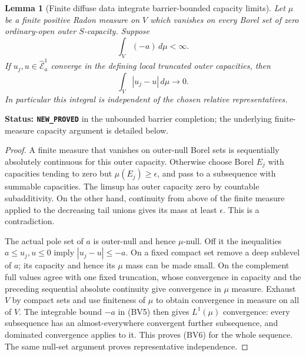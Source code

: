 \documentclass[11pt,a4paper]{article}
\numberwithin{equation}{section}
\newtheorem{lemma}[theorem]{Lemma}
\theoremstyle{definition}
\theoremstyle{remark}
\begin{document}
\begin{lemma}[Finite diffuse data integrate barrier-bounded capacity limits]
\label{lem:r11-barrier-diffuse-integration}
Let $\mu$ be a finite positive Radon measure on $V$
which vanishes on every Borel set of zero ordinary-open
outer $S$-capacity.  Suppose
\[
                              \int_V(-a)\,d\mu<\infty.
 \tag{BV5}
\]
If $u_j,u\in\widehat{\mathcal E}^1_a$ converge in the
defining local truncated outer capacities, then
\[
                           \int_V|u_j-u|\,d\mu\longrightarrow0.
 \tag{BV6}
\]
In particular this integral is independent of the
chosen relative representatives.
\end{lemma}

\noindent\textbf{Status: \texttt{NEW\_PROVED}}
in the unbounded barrier completion; the underlying
finite-measure capacity argument is detailed below.

\begin{proof}
A finite measure that vanishes on outer-null Borel
sets is sequentially absolutely continuous for this
outer capacity.  Otherwise choose Borel $E_j$ with
capacities tending to zero but $\mu(E_j)\geq\epsilon$,
and pass to a subsequence with summable capacities.
The limsup has outer capacity zero by countable
subadditivity.  On the other hand, continuity from
above of the finite measure applied to the decreasing
tail unions gives its mass at least $\epsilon$.
This is a contradiction.

The actual pole set of $a$ is outer-null and hence
$\mu$-null.  Off it the inequalities
$a\leq u_j,u\leq0$ imply
$|u_j-u|\leq-a$.
On a fixed compact set remove a deep sublevel of $a$;
its capacity and hence its $\mu$ mass can be made
small.  On the complement full values agree with
one fixed truncation, whose convergence in capacity
and the preceding sequential absolute continuity
give convergence in $\mu$ measure.
Exhaust $V$ by compact sets and use finiteness of
$\mu$ to obtain convergence in measure on all of $V$.
The integrable bound $-a$ in (BV5) then gives
$L^1(\mu)$ convergence: every subsequence has an
almost-everywhere convergent further subsequence,
and dominated convergence applies to it.
This proves (BV6) for the whole sequence.
The same null-set argument proves representative
independence.
\end{proof}
\end{document}
